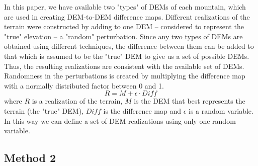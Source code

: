 \documentclass{article}
\begin{document}
In this paper, we have available two "types" of DEMs of each mountain,
which are used in creating DEM-to-DEM difference maps.  Different
realizations of the terrain were constructed by adding to one DEM --
considered to represent the "true" elevation -- a "random"
perturbation.  Since any two types of DEMs are obtained using
different techniques, the difference between them can be added to that
which is assumed to be the "true" DEM to give us a set of possible
DEMs. Thus, the resulting realizations are consistent with the
available set of DEMs. Randomness in the perturbations is created by
multiplying the difference map with a normally distributed factor
between 0 and 1.
\begin{equation}
R = M + \epsilon \cdot Diff
\label{eq:two}
\end{equation}
where $R$ is a realization of the terrain, $M$ is the DEM that best
represents the terrain (the "true" DEM), $Diff$ is the difference map
and $\epsilon$ is a random variable.  In this way we can define a set
of DEM realizations using only one random variable.

\subsection{Method 2}
\label{Method2}

\end{document}
